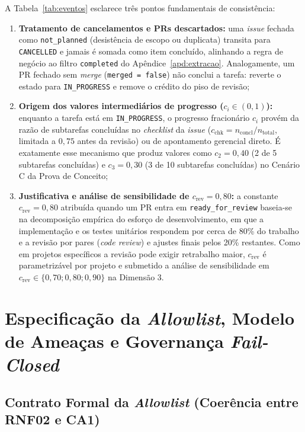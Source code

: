 \documentclass[12pt,openany,oneside,a4paper,english,brazilian,sumario=tradicional]{abntex2}
\begin{document}
A Tabela~\ref{tab:eventos} esclarece três pontos fundamentais de consistência:
\begin{enumerate}
  \item \textbf{Tratamento de cancelamentos e PRs descartados:} uma \textit{issue} fechada como \texttt{not\_planned} (desistência de escopo ou duplicata) transita para \texttt{CANCELLED} e jamais é somada como item concluído, alinhando a regra de negócio ao filtro \texttt{completed} do Apêndice~\ref{apd:extracao}. Analogamente, um PR fechado sem \textit{merge} (\texttt{merged = false}) não conclui a tarefa: reverte o estado para \texttt{IN\_PROGRESS} e remove o crédito do piso de revisão;
  \item \textbf{Origem dos valores intermediários de progresso ($c_i \in (0, 1)$):} enquanto a tarefa está em \texttt{IN\_PROGRESS}, o progresso fracionário $c_i$ provém da razão de subtarefas concluídas no \textit{checklist} da \textit{issue} ($c_{\mathrm{chk}} = n_{\mathrm{concl}}/n_{\mathrm{total}}$, limitada a $0{,}75$ antes da revisão) ou de apontamento gerencial direto. É exatamente esse mecanismo que produz valores como $c_2 = 0{,}40$ (2 de 5 subtarefas concluídas) e $c_3 = 0{,}30$ (3 de 10 subtarefas concluídas) no Cenário C da Prova de Conceito;
  \item \textbf{Justificativa e análise de sensibilidade de $c_{\mathrm{rev}} = 0{,}80$:} a constante $c_{\mathrm{rev}} = 0{,}80$ atribuída quando um PR entra em \texttt{ready\_for\_review} baseia-se na decomposição empírica do esforço de desenvolvimento, em que a implementação e os testes unitários respondem por cerca de 80\% do trabalho e a revisão por pares (\textit{code review}) e ajustes finais pelos 20\% restantes. Como em projetos específicos a revisão pode exigir retrabalho maior, $c_{\mathrm{rev}}$ é parametrizável por projeto e submetido a análise de sensibilidade em $c_{\mathrm{rev}} \in \{0{,}70; 0{,}80; 0{,}90\}$ na Dimensão 3.
\end{enumerate}

\section{Especificação da \textit{Allowlist}, Modelo de Ameaças e Governança \textit{Fail-Closed}}\label{sec:ameacas_ia}

\subsection{Contrato Formal da \textit{Allowlist} (Coerência entre RNF02 e CA1)}
\end{document}

